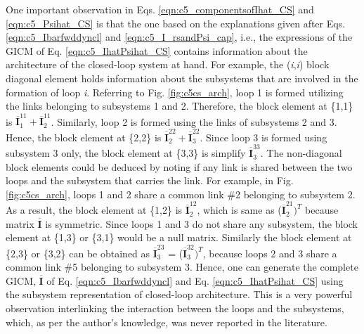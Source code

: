 {One important observation in Eqs. \ref{eqn:c5_componentsofIhat_CS} and \ref{eqn:c5_Psihat_CS} is that the one based on the explanations given after Eqs. \ref{eqn:c5_Ibarfwddyncl} and \ref{eqn:c5_I_rsandPsi_cap}, i.e., the expressions of the GICM of Eq. \ref{eqn:c5_IhatPsihat_CS} contains information about the architecture of the closed-loop system at hand. For example, the (\emph{i},\emph{i}) block diagonal element holds information about the subsystems that are involved in the formation of loop \emph{i}. Referring to Fig. \ref{fig:c5cs_arch}, loop 1 is formed utilizing the links belonging to subsystems 1 and 2. Therefore, the block element at \{1,1\} is $\mathbf{\overline{I}}_1^{11} + \mathbf{\overline{I}}_2^{11}$. Similarly, loop 2 is formed using the links of subsystems 2 and 3. Hence, the block element at \{2,2\} is $\mathbf{\overline{I}}_2^{22} + \mathbf{\overline{I}}_3^{22}$. Since loop 3 is formed using subsystem 3 only, the block element at \{3,3\} is simplify $\mathbf{\overline{I}}_3^{33}$. The non-diagonal block elements could be deduced by noting if any link is shared between the two loops and the subsystem that carries the link. For example, in Fig. \ref{fig:c5cs_arch}, loops 1 and 2 share a common link \#2 belonging to subsystem 2. As a result, the block element at \{1,2\} is $\mathbf{\overline{I}}_2^{12}$, which is same as ($\mathbf{\overline{I}}_2^{21})^T$ because matrix $\mathbf{\overline{I}}$ is symmetric. Since loops 1 and 3 do not share any subsystem, the block element at \{1,3\} or \{3,1\} would be a null matrix. Similarly the block element at \{2,3\} or \{3,2\} can be obtained as $\mathbf{\overline{I}}_3^{23}$ = ($\mathbf{\overline{I}}_3^{32})^T$, because loops 2 and 3 share a common link \#5 belonging to subsystem 3. Hence, one can generate the complete GICM, $\mathbf{\overline{I}}$ of Eq. \ref{eqn:c5_Ibarfwddyncl} and Eq. \ref{eqn:c5_IhatPsihat_CS} using the subsystem representation of closed-loop architecture. This is a very powerful observation interlinking the interaction between the loops and the subsystems, which, as per the author's knowledge, was never reported in the literature. 

}
